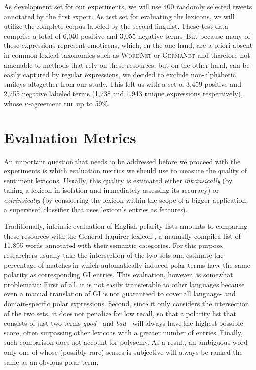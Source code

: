 As development set for our experiments, we will use 400 randomly
selected tweets annotated by the first expert.  As test set for
evaluating the lexicons, we will utilize the complete corpus labeled
by the second linguist.  These test data comprise a total of 6,040
positive and 3,055 negative terms.  But because many of these
expressions represent emoticons, which, on the one hand, are a priori
absent in common lexical taxonomies such as \textsc{WordNet}
\cite{Miller:95,Miller:07} or \textsc{GermaNet} \cite{Hamp:97} and
therefore not amenable to methods that rely on these resources, but on
the other hand, can be easily captured by regular expressions, we
decided to exclude non-alphabetic smileys altogether from our study.
This left us with a set of 3,459 positive and 2,755 negative labeled
terms (1,738 and 1,943 unique expressions respectively), whose
$\kappa$-agreement run up to 59\%.

\section{Evaluation Metrics}\label{sec:snt-lex:eval-metrics}

An important question that needs to be addressed before we proceed
with the experiments is which evaluation metrics we should use to
measure the quality of sentiment lexicons.  Usually, this quality is
estimated either \textit{intrinsically} (by taking a lexicon in
isolation and immediately assessing its accuracy) or
\textit{extrinsically} (by considering the lexicon within the scope of
a bigger application, \eg{} a supervised classifier that uses
lexicon's entries as features).

Traditionally, intrinsic evaluation of English polarity lists amounts
to comparing these resources with the General Inquirer lexicon
\cite[GI; ][]{Stone:66}, a manually compiled list of 11,895 words
annotated with their semantic categories.  For this purpose,
researchers usually take the intersection of the two sets and estimate
the percentage of matches in which automatically induced polar terms
have the same polarity as corresponding GI entries.  This evaluation,
however, is somewhat problematic: First of all, it is not easily
transferable to other languages because even a manual translation of
GI is not guaranteed to cover all language- and domain-specific polar
expressions.  Second, since it only considers the intersection of the
two sets, it does not penalize for low recall, so that a polarity list
that consists of just two terms \textit{good}$^+$ and \textit{bad}$^-$
will always have the highest possible score, often surpassing other
lexicons with a greater number of entries.  Finally, such comparison
does not account for polysemy.  As a result, an ambiguous word only
one of whose (possibly rare) senses is subjective will always be
ranked the same as an obvious polar term.

